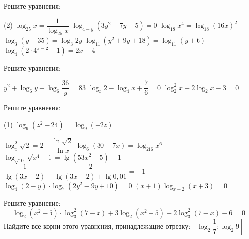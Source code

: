 \begin{homework}[number=2]
	\begin{listofex}
		\item Решите уравнения:
		\begin{tasks}(2) %
			\task \( \log_{25}x=\dfrac{ 1 }{ \log_{25}x } \)
			\task \( \log_{4-y}(3y^2-7y-5)=0 \)
			\task \( \log_{18}x^4 = \log_{18}(16x)^2 \)
			\task \( \log_{3}(y-35)=\log_{3}2y \)
			\task \( \log_{11}(y^2+9y+18)=\log_{11}(y+6) \)
			\task \( \log_4 (2 \cdot 4^{x-2}-1)=2x-4 \)
		\end{tasks}
		\item Решите уравнения:
		\begin{tasks}
			\task \( y^2+\log_{6}y+\log_{6}\dfrac{ 36 }{ y }=83 \)
			\task \( \log_x 2 - \log_4 x + \dfrac{7}{6} = 0 \)
			\task \( \log_2^2 x - 2\log_2 x -3 =0 \)
		\end{tasks}
		
	\end{listofex}
\end{homework}

\begin{class}[number=5]
	\begin{listofex}
		\item Решите уравнения: %
		\begin{tasks}(1)
			\task \( \log_9(z^2-24)=\log_9(-2z) \)
			
			\task \( \log ^2 _x \sqrt{2} = 2 - \dfrac{ \ln \sqrt{2} }{ \ln x } \)
			\task \( \log_6(30-7x)=\log_{216}x^6 \)
			\task \( \log_{\sqrt{10}} \sqrt{x^4+1} = \lg (53x^2-5)-1 \)
			\task \( \dfrac{ 1 }{ \lg (3x-2) } + \dfrac{ 2 }{ \lg (3x-2) + \lg 0,01 } = -1 \)
			\task \( \log_4 (2-y) \cdot \log_7 (2y^2-9y+10) = 0 \)
			\task \( (x+1)\log_{x+2}(x+3)=0 \)
			
		\end{tasks}
		\item %
		\begin{tasks}
			\task Решите уравнение: \[ \log_2(x^2-5) \cdot \log_3^2(7-x) + 3\log_2(x^2-5)-2\log_3^2(7-x)-6=0 \]
			\task Найдите все корни этого уравнения, принадлежащие отрезку: \( \left[ \log_2 \dfrac{1}{7}; \log_2 9 \right]  \)
		\end{tasks}
	\end{listofex}
\end{class}

